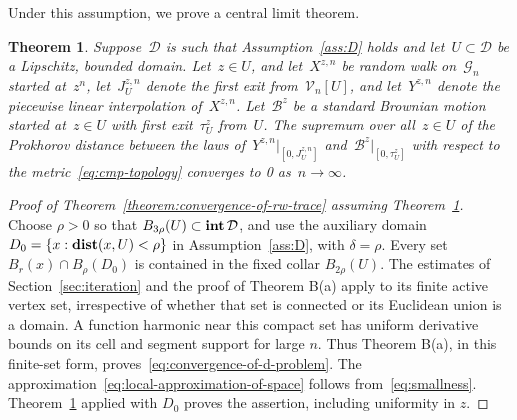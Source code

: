 \documentclass[12pt]{amsart}
\numberwithin{equation}{section}
\DeclareMathOperator{\dist}{\mathop{\bf dist{}}}
\DeclareMathOperator{\intr}{\mathop{\bf int}}
\newtheorem{theorem}{Theorem}[section]
\newcommand{\G}{\mathcal{G}}
\newcommand{\V}{\mathcal{V}}
\begin{document}
Under this assumption, we prove a central limit theorem.

\begin{theorem}
	\label{theorem:general-clt}
	Suppose~$\mathcal{D}$ is such that Assumption~\ref{ass:D} holds and let~$U \subset \mathcal{D}$ be a {Lipschitz}, bounded domain. Let~$z \in U$, and let~$X^{z, n}$ be random walk on~$\G_n$ 
	started at~$z^{n}$, let~$J^{z, n}_U$ denote the first exit from~$\V_n[U]$,
	and let~$Y^{z, n}$ denote the piecewise linear interpolation of~$X^{z, n}$.
	Let~$\mathcal{B}^z$ be a standard Brownian motion started at~$z \in U$ with first exit~$\tau^{z}_U$ from~$U$. 
	The supremum over all~$z \in U$ of the Prokhorov distance between the laws of~$Y^{z, n} \vert_{[0,J^{z, n}_U]}$ and~$\mathcal{B}^{z} \vert_{[0, \tau^{z}_U]}$ with respect to the metric~\eqref{eq:cmp-topology} converges to 0 as~$n \to \infty$. 
\end{theorem}

\begin{proof}[Proof of Theorem~\ref{theorem:convergence-of-rw-trace} assuming Theorem~\ref{theorem:general-clt}]
Choose $\rho>0$ so that $B_{3\rho}(U)\subset\intr\mathcal D$, and use the auxiliary domain $D_0=\{x:\dist(x,U)<\rho\}$ in Assumption~\ref{ass:D}, with $\delta=\rho$. Every set $B_r(x)\cap B_\rho(D_0)$ is contained in the fixed collar $B_{2\rho}(U)$. The estimates of Section~\ref{sec:iteration} and the proof of Theorem B(a) apply to its finite active vertex set, irrespective of whether that set is connected or its Euclidean union is a domain. A function harmonic near this compact set has uniform derivative bounds on its cell and segment support for large $n$. Thus Theorem B(a), in this finite-set form, proves~\eqref{eq:convergence-of-d-problem}. The approximation~\eqref{eq:local-approximation-of-space} follows from~\eqref{eq:smallness}. Theorem~\ref{theorem:general-clt} applied with $D_0$ proves the assertion, including uniformity in $z$.
\end{proof}
\end{document}
